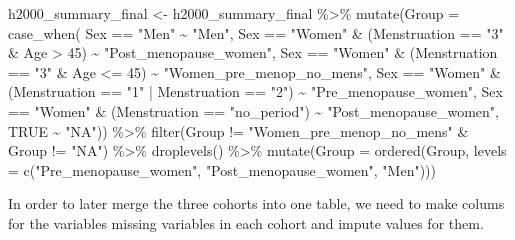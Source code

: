 \documentclass[
]{article}
\newenvironment{Shaded}{\begin{snugshade}}{\end{snugshade}}
\newcommand{\AttributeTok}[1]{\textcolor[rgb]{0.77,0.63,0.00}{#1}}
\newcommand{\ConstantTok}[1]{\textcolor[rgb]{0.00,0.00,0.00}{#1}}
\newcommand{\DecValTok}[1]{\textcolor[rgb]{0.00,0.00,0.81}{#1}}
\newcommand{\FunctionTok}[1]{\textcolor[rgb]{0.00,0.00,0.00}{#1}}
\newcommand{\NormalTok}[1]{#1}
\newcommand{\OtherTok}[1]{\textcolor[rgb]{0.56,0.35,0.01}{#1}}
\newcommand{\SpecialCharTok}[1]{\textcolor[rgb]{0.00,0.00,0.00}{#1}}
\newcommand{\StringTok}[1]{\textcolor[rgb]{0.31,0.60,0.02}{#1}}
\begin{document}
\begin{Shaded}
\begin{Highlighting}[]
\NormalTok{h2000\_summary\_final }\OtherTok{\textless{}{-}}\NormalTok{ h2000\_summary\_final }\SpecialCharTok{\%\textgreater{}\%}
  \FunctionTok{mutate}\NormalTok{(}\AttributeTok{Group =} \FunctionTok{case\_when}\NormalTok{(}
\NormalTok{    Sex }\SpecialCharTok{==} \StringTok{"Men"} \SpecialCharTok{\textasciitilde{}} \StringTok{"Men"}\NormalTok{,}
\NormalTok{    Sex }\SpecialCharTok{==} \StringTok{"Women"} \SpecialCharTok{\&}\NormalTok{ (Menstruation }\SpecialCharTok{==} \StringTok{"3"} \SpecialCharTok{\&}\NormalTok{ Age }\SpecialCharTok{\textgreater{}} \DecValTok{45}\NormalTok{) }\SpecialCharTok{\textasciitilde{}} \StringTok{"Post\_menopause\_women"}\NormalTok{,}
\NormalTok{    Sex }\SpecialCharTok{==} \StringTok{"Women"} \SpecialCharTok{\&}\NormalTok{ (Menstruation }\SpecialCharTok{==} \StringTok{"3"} \SpecialCharTok{\&}\NormalTok{ Age }\SpecialCharTok{\textless{}=} \DecValTok{45}\NormalTok{) }\SpecialCharTok{\textasciitilde{}} \StringTok{"Women\_pre\_menop\_no\_mens"}\NormalTok{,}
\NormalTok{    Sex }\SpecialCharTok{==} \StringTok{"Women"} \SpecialCharTok{\&}\NormalTok{ (Menstruation }\SpecialCharTok{==} \StringTok{"1"} \SpecialCharTok{|}\NormalTok{ Menstruation }\SpecialCharTok{==} \StringTok{"2"}\NormalTok{) }\SpecialCharTok{\textasciitilde{}} \StringTok{"Pre\_menopause\_women"}\NormalTok{, }
\NormalTok{    Sex }\SpecialCharTok{==} \StringTok{"Women"} \SpecialCharTok{\&}\NormalTok{ (Menstruation }\SpecialCharTok{==} \StringTok{"no\_period"}\NormalTok{) }\SpecialCharTok{\textasciitilde{}} \StringTok{"Post\_menopause\_women"}\NormalTok{,}
    \ConstantTok{TRUE} \SpecialCharTok{\textasciitilde{}} \StringTok{"NA"}\NormalTok{)) }\SpecialCharTok{\%\textgreater{}\%}
  \FunctionTok{filter}\NormalTok{(Group }\SpecialCharTok{!=} \StringTok{"Women\_pre\_menop\_no\_mens"} \SpecialCharTok{\&}\NormalTok{ Group }\SpecialCharTok{!=} \StringTok{"NA"}\NormalTok{) }\SpecialCharTok{\%\textgreater{}\%}
  \FunctionTok{droplevels}\NormalTok{() }\SpecialCharTok{\%\textgreater{}\%}
  \FunctionTok{mutate}\NormalTok{(}\AttributeTok{Group =} \FunctionTok{ordered}\NormalTok{(Group, }\AttributeTok{levels =}  \FunctionTok{c}\NormalTok{(}\StringTok{"Pre\_menopause\_women"}\NormalTok{, }\StringTok{"Post\_menopause\_women"}\NormalTok{, }\StringTok{"Men"}\NormalTok{)))}
\end{Highlighting}
\end{Shaded}

In order to later merge the three cohorts into one table, we need to
make colums for the variables missing variables in each cohort and
impute values for them.
\end{document}
